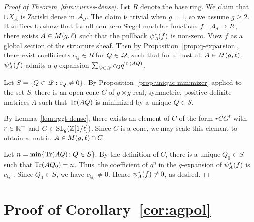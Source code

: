 \documentclass{amsart}
\begin{document}
\begin{proof}[Proof of Theorem~\ref{thm:curves-dense}]
  Let $R$ denote the base ring. We claim that $\cup X_A$ is Zariski dense in $\mathcal{A}_g$. The claim is trivial when $g = 1$, so we assume $g \geq 2$. It suffices to show that for all non-zero Siegel modular functions $f: \mathcal{A}_g \to R$, there exists $A \in M(g,\ell)$ such that the pullback $\psi_{A}^*(f)$ is non-zero. View $f$ as a global section of the structure sheaf. Then by Proposition~\ref{prop:q-expansion}, there exist coefficients $c_Q \in R$ for $Q \in \mathscr{Q}$, such that for almost all $A \in M(g,\ell)$, $\psi_{A}^*(f)$ admits a $q$-expansion $\sum_{Q \in \mathscr{Q}} c_Q q^{\operatorname{Tr}(AQ)}$.

  Let $S = \{ Q \in \mathscr{Q} :c_Q \neq 0\}$. By Proposition~\ref{prop:unique-minimizer} applied to the set $S$, there is an open cone $C$ of $g \times g$ real, symmetric, positive definite matrices $A$ such that $\operatorname{Tr}(AQ)$ is minimized by a unique $Q \in S$.

  By Lemma~\ref{lem:rggt-dense}, there exists an element of $C$ of the form $rGG^t$ with $r \in \mathbb{R}^+$ and $G \in \operatorname{SL}_g(\mathbb{Z}[1/\ell])$. Since $C$ is a cone, we may scale this element to obtain a matrix $A \in M(g,\ell) \cap C$. %

  Let $n = \min \{\operatorname{Tr}(AQ) \colon Q \in S\}$. By the definition of $C$, there is a unique $Q_0 \in S$ such that $\operatorname{Tr}(AQ_0) = n$. %
  Thus, the coefficient of $q^n$ in the $q$-expansion of $\psi_{A}^*(f)$ is $c_{Q_0}$. Since $Q_0 \in S$, we have $c_{Q_0} \ne 0$. Hence $\psi_{A}^*(f) \neq 0$, as desired.
\end{proof}


\section{Proof of Corollary~\ref{cor:agpol}}
\label{sec:Cor15proof}
\end{document}
